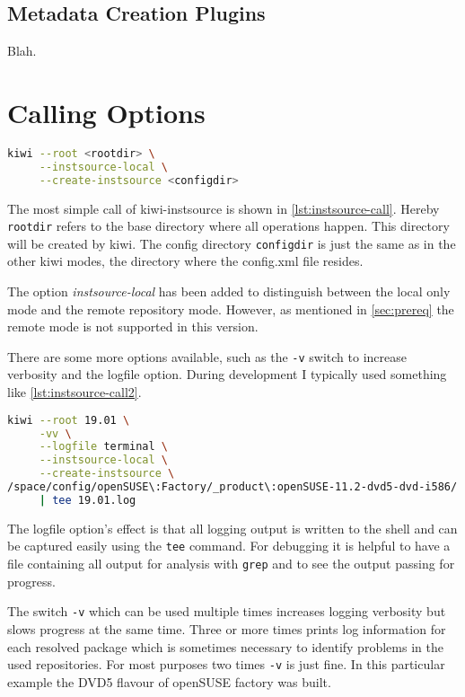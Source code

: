 \subsection{Metadata Creation Plugins}
\label{subsec:plugins}

Blah.


\section{Calling Options}
\label{sec:options}

\begin{lstlisting}[language=Bash, caption={Calling kiwi-instsource},
label={lst:instsource-call}]
kiwi --root <rootdir> \
     --instsource-local \
     --create-instsource <configdir>
\end{lstlisting}

The most simple call of kiwi-inst\-source is shown in \vref{lst:instsource-call}.
Hereby \texttt{root\-dir} refers to the base directory where all operations
happen. This directory will be created by kiwi. The config directory
\texttt{con\-fig\-dir} is just the same as in the other kiwi modes, the directory
where the config.xml file resides.

The option \textit{instsource-local}  has been added to distinguish between the
local only mode and the remote repository mode. However, as mentioned in
\vref{sec:prereq} the remote mode is not supported in this version.

There are some more options available, such as the \texttt{-v} switch to
increase verbosity and the logfile option. %
During development I typically used something like \vref{lst:instsource-call2}.

\begin{lstlisting}[language=Bash, caption={Typical kiwi-instsource call during
development},
label={lst:instsource-call2}]
kiwi --root 19.01 \
     -vv \
     --logfile terminal \
     --instsource-local \
     --create-instsource \
/space/config/openSUSE\:Factory/_product\:openSUSE-11.2-dvd5-dvd-i586/ \
     | tee 19.01.log
\end{lstlisting}

The logfile option's effect is that all logging output is written to the shell
and can be captured easily using the \texttt{tee} command. For debugging it is
helpful to have a file containing all output for analysis with \texttt{grep} and
to see the output passing for progress.

The switch \texttt{-v} which can be used multiple times increases logging
verbosity but slows progress at the same time. Three or more times prints log
information for each resolved package which is sometimes necessary to identify
problems in the used repositories. For most purposes two times \texttt{-v} is
just fine. In this particular example the DVD5 flavour of openSUSE factory was
built.


